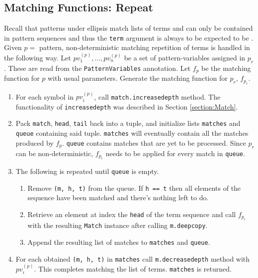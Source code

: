 \subsection{Matching Functions: Repeat}
\label{section:pattern-repeat}
Recall that patterns under ellipsis match lists of terms and can only be contained in pattern sequences and thus the \texttt{term} argument is always to be expected to be \newline \PatternSequence. Given $p=$ \PatternRepeat \space pattern, non-deterministic matching repetition of terms is handled in the following way. Let $pv_1^{(p)}, ..., pv_n^{(p)}$ be a set of pattern-variables assigned in $p_r$. These are read from the \newline \texttt{PatternVariables} annotation.  Let $f_p$ be the matching function for $p$ with usual parameters. Generate the matching function for $p_r$, $f_{p_r}$.

\begin{enumerate}
\item
For each symbol in $pv_i^{(p)}$, call \texttt{match.increasedepth} method. The functionality of \texttt{increasedepth} was described in Section \ref{section:Match}.
\item
Pack \texttt{match}, \texttt{head}, \texttt{tail} back into a tuple, and initialize lists \texttt{matches} and \texttt{queue} containing said tuple. \texttt{matches} will eventually contain all the matches produced by $f_p$. \texttt{queue} contains matches that are yet to be processed. Since $p_r$ can be non-deterministic, $f_{p_r}$ needs to be applied for every match in \texttt{queue}.
\item The following is repeated until \texttt{queue} is empty.
	\begin{enumerate}
	\item
	Remove \texttt{(m, h, t)} from the queue. If \texttt{h == t} then all elements of the sequence have been matched and there's nothing left to do.
	\item
	Retrieve an element at index the \texttt{head} of the term sequence and call $f_{p_r}$ with the resulting \texttt{Match} instance after calling \texttt{m.deepcopy}.
	\item Append the resulting list of matches to \texttt{matches} and \texttt{queue}.
	\end{enumerate}

\item
For each obtained \texttt{(m, h, t)} in \texttt{matches} call \texttt{m.decreasedepth} method with $pv_i^{(p)}$. This completes matching the list of terms. \texttt{matches} is returned.
\end{enumerate}

